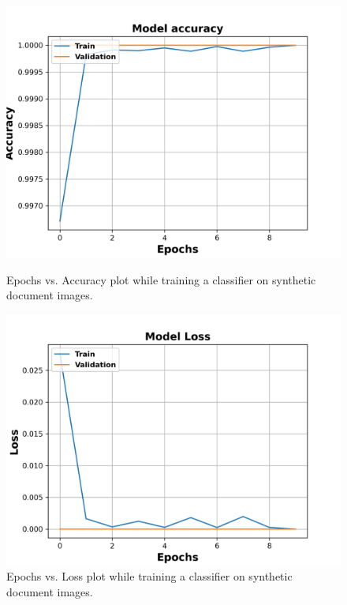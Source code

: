 \begin{figure}[H]
  \centering
  \begin{minipage}[b]{0.49\textwidth}
    \includegraphics[width=\textwidth]{images/Evaluation/Synthetic_Data_Classifier_2021-05-31_16-40-33_Accuracy.png}
    \caption[Epochs vs. Accuracy plot while training a classifier on synthetic document images.]{Epochs vs. Accuracy plot while training a classifier on synthetic document images.}
    \label{fig:SyntheticClassifierAcc}
  \end{minipage}
  \hfill
  \begin{minipage}[b]{0.49\textwidth}
    \includegraphics[width=\textwidth]{images/Evaluation/Synthetic_Data_Classifier_2021-05-31_16-40-33_Loss.png}
    \caption[Epochs vs. Loss plot while training a classifier on synthetic document images.]{Epochs vs. Loss plot while training a classifier on synthetic document images.}
    \label{fig:SyntheticClassifierLoss}
  \end{minipage}
\end{figure}


